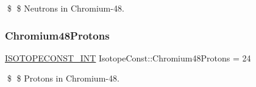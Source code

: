 \$ \$ Neutrons in Chromium-\/48. \mbox{\label{group___isotope_const-_chromium-_cr48_ga4d509c46efc31cc4774e9ce50ab279cc}} 
\subsubsection{\texorpdfstring{Chromium48\+Protons}{Chromium48Protons}}
{\footnotesize\ttfamily \mbox{\hyperlink{group___isotope_const-_macros_ga5f18360b3e99483a35c32d789e62621c}{I\+S\+O\+T\+O\+P\+E\+C\+O\+N\+S\+T\+\_\+\+I\+NT}} Isotope\+Const\+::\+Chromium48\+Protons = 24}

\$ \$ Protons in Chromium-\/48. 